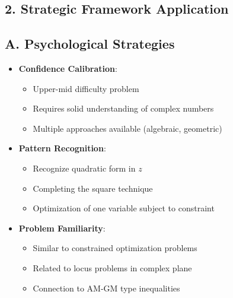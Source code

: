 \documentclass[11pt]{article}
\begin{document}
\begin{strategybox}
\section*{2. Strategic Framework Application}

\subsection*{A. Psychological Strategies}
\begin{itemize}[leftmargin=*]
    \item \textbf{Confidence Calibration}: 
    \begin{itemize}
        \item Upper-mid difficulty problem
        \item Requires solid understanding of complex numbers
        \item Multiple approaches available (algebraic, geometric)
    \end{itemize}
    \item \textbf{Pattern Recognition}:
    \begin{itemize}
        \item Recognize quadratic form in $z$
        \item Completing the square technique
        \item Optimization of one variable subject to constraint
    \end{itemize}
    \item \textbf{Problem Familiarity}:
    \begin{itemize}
        \item Similar to constrained optimization problems
        \item Related to locus problems in complex plane
        \item Connection to AM-GM type inequalities
    \end{itemize}
\end{itemize}


\end{strategybox}
\end{document}
